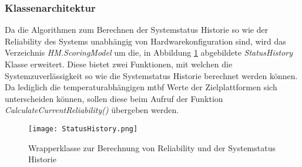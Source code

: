 \subsubsection*{Klassenarchitektur}
Da die Algorithmen zum Berechnen der Systemstatus Historie so wie der Reliability des Systems unabhängig von Hardwarekonfiguration sind, wird das Verzeichnis \textit{HM.ScoringModel} um die, in Abbildung \ref{fig:SystemHistoryWrapper} abgebildete \textit{StatusHistory} Klasse erweitert. Diese bietet zwei Funktionen, mit welchen die Systemzuverlässigkeit so wie die Systemstatus Historie berechnet werden können. Da lediglich die temperaturabhängigen \ac{mtbf} Werte der Zielplattformen sich unterscheiden können, sollen diese beim Aufruf der Funktion \textit{CalculateCurrentReliability()} übergeben werden.\\
\newpage
\begin{center}
    \begin{figure}[h!]
        \captionsetup{justification=centering,format=plain, font=small}
        \centering
        \texttt{[image: StatusHistory.png]}
        \caption{Wrapperklasse zur Berechnung von Reliability und der Systemstatus Historie}
        \label{fig:SystemHistoryWrapper}
    \end{figure}
\end{center}
\vspace{-0.5cm}
